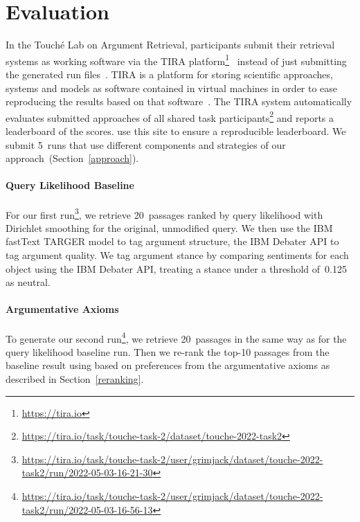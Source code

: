 \section{Evaluation}
\label{evaluation}

In the Touché Lab on Argument Retrieval, participants submit their retrieval systems as working software via the TIRA platform\footnote{\url{https://tira.io}}~\cite{PotthastGWS2019} instead of just submitting the generated run files~\cite{BondarenkoFKSGBPBSWPH2022}.
TIRA is a platform for storing scientific approaches, systems and models as software contained in virtual machines in order to ease reproducing the results based on that software~\cite{PotthastGWS2019}.
The TIRA system automatically evaluates submitted approaches of all shared task participants\footnote{\url{https://tira.io/task/touche-task-2/dataset/touche-2022-task2}} and reports a leaderboard of the  scores.
\citet{BondarenkoFKSGBPBSWPH2022} use this site to ensure a reproducible leaderboard.
We submit 5~runs that use different components and strategies of our approach~(Section~\ref{approach}).

\paragraph{Query Likelihood Baseline}

For our first run\footnote{\url{https://tira.io/task/touche-task-2/user/grimjack/dataset/touche-2022-task2/run/2022-05-03-16-21-30}}, we retrieve 20~passages ranked by query likelihood with Dirichlet smoothing for the original, unmodified query. We then use the IBM fastText TARGER model to tag argument structure,
the IBM Debater API to tag argument quality.
We tag argument stance by comparing sentiments for each object using the IBM Debater API, treating a stance under a threshold of~0.125 as neutral.

\paragraph{Argumentative Axioms}

To generate our second run\footnote{\url{https://tira.io/task/touche-task-2/user/grimjack/dataset/touche-2022-task2/run/2022-05-03-16-56-13}}, we retrieve 20~passages in the same way as for the query likelihood baseline run. Then we re-rank the top-10 passages from the baseline result using \KwikSort based on preferences from the argumentative axioms as described in Section~\ref{reranking}.

